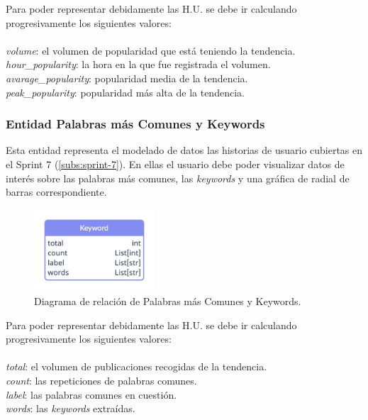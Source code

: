 Para poder representar debidamente las H.U. se debe ir calculando progresivamente los siguientes valores:
\\\\
\textit{volume}: el volumen de popularidad que está teniendo la tendencia.  \\
\textit{hour\_popularity}: la hora en la que fue registrada el volumen.    \\
\textit{avarage\_popularity}: popularidad media de la tendencia.    \\
\textit{peak\_popularity}: popularidad más alta de la tendencia.

\subsubsection{Entidad Palabras más Comunes y Keywords}\label{subsub:ent-keywords}
Esta entidad representa el modelado de datos las historias de usuario cubiertas en el Sprint 7 (\ref{subs:sprint-7}). En ellas el usuario debe poder visualizar datos de interés sobre las palabras más comunes, las \textit{keywords} y una gráfica de radial de barras correspondiente.
\begin{figure}[H]
    \centering
    \myfloatalign
    \includegraphics[width=0.4\textwidth]{gfx/diagrama-er2.png}
    \caption[Diagrama de relación de Palabras más Comunes y Keywords]{Diagrama de relación de Palabras más Comunes y Keywords.}\label{gfx:diagrama-er2}
\end{figure}

Para poder representar debidamente las H.U. se debe ir calculando progresivamente los siguientes valores:
\\\\
\textit{total}: el volumen de publicaciones recogidas de la tendencia.  \\
\textit{count}: las repeticiones de palabras comunes.    \\
\textit{label}: las palabras comunes en cuestión.    \\
\textit{words}: las \textit{keywords} extraídas.

